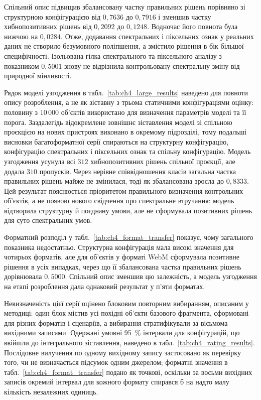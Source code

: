 Спільний опис підвищив збалансовану частку правильних рішень порівняно зі структурною конфігурацією від $0{,}7636$ до $0{,}7916$ і зменшив частку хибнопозитивних рішень від $0{,}2092$ до $0{,}1248$. Водночас його повнота була нижчою на $0{,}0284$. Отже, додавання спектральних і піксельних ознак у реальних даних не створило безумовного поліпшення, а змістило рішення в бік більшої специфічності. Ізольована гілка спектрального та піксельного аналізу з показником $0{,}5001$ знову не відрізнила контрольовану спектральну зміну від природної мінливості.

Рядок моделі узгодження в табл.~\ref{tab:ch4_large_results} наведено для повноти опису розроблення, а не як зіставну з трьома статичними конфігураціями оцінку: половину з $10\,000$ об’єктів використано для визначення параметрів моделі та її порога. Заздалегідь відокремлене зовнішнє зіставлення моделі зі спільною проєкцією на нових пристроях виконано в окремому підрозділі, тому подальші висновки багатоформатної серії спираються на структурну конфігурацію, конфігурацію спектральних і піксельних ознак та спільну конфігурацію. Модель узгодження усунула всі $312$ хибнопозитивних рішень спільної проєкції, але додала $310$ пропусків. Через нерівне співвідношення класів загальна частка правильних рішень майже не змінилася, тоді як збалансована зросла до $0{,}8333$. Цей результат пояснюється пріоритетом правильного визначення контрольних об’єктів, а не появою нового свідчення про спектральне втручання: модель відтворила структурну й поєднану умови, але не сформувала позитивних рішень для суто спектральних умов.

Форматний розподіл у табл.~\ref{tab:ch4_format_transfer} показує, чому загального показника недостатньо. Структурна конфігурація мала високі значення для чотирьох форматів, але для об’єктів у форматі WebM сформувала позитивне рішення в усіх випадках, через що її збалансована частка правильних рішень дорівнювала $0{,}5000$. Спільний опис зменшив цю залежність, а модель узгодження на етапі розроблення дала однаковий результат у п’яти форматах.

Невизначеність цієї серії оцінено блоковим повторним вибиранням, описаним у методиці: один блок містив усі похідні об’єкти базового фрагмента, сформовані для різних форматів і сценаріїв, а вибирання стратифікували за вісьмома вихідними записами. Одержані умовні 95~\% інтервали для конфігурацій, що ввійшли до інтегрального зіставлення, наведено в табл.~\ref{tab:ch4_rating_results}. Послідовне вилучення по одному вихідному запису застосовано як перевірку того, чи не визначається підсумок одним джерелом; форматні значення в табл.~\ref{tab:ch4_format_transfer} подано як точкові, оскільки за восьми вихідних записів окремий інтервал для кожного формату спирався б на надто малу кількість незалежних одиниць.

